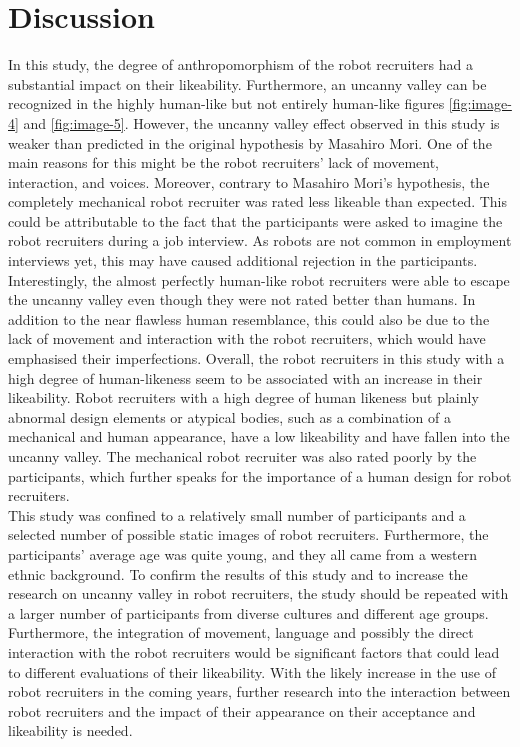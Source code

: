 \section{Discussion}
In this study, the degree of anthropomorphism of the robot recruiters had a substantial impact on their likeability. Furthermore, an uncanny valley can be recognized in the highly human-like but not entirely human-like figures \ref{fig:image-4} and \ref{fig:image-5}. However, the uncanny valley effect observed in this study is weaker than predicted in the original hypothesis by Masahiro Mori. One of the main reasons for this might be the robot recruiters' lack of movement, interaction, and voices. Moreover, contrary to Masahiro Mori's hypothesis, the completely mechanical robot recruiter was rated less likeable than expected. This could be attributable to the fact that the participants were asked to imagine the robot recruiters during a job interview. As robots are not common in employment interviews yet, this may have caused additional rejection in the participants.
Interestingly, the almost perfectly human-like robot recruiters were able to escape the uncanny valley even though they were not rated better than humans. In addition to the near flawless human resemblance, this could also be due to the lack of movement and interaction with the robot recruiters, which would have emphasised their imperfections. 
Overall, the robot recruiters in this study with a high degree of human-likeness seem to be  associated with an increase in their likeability. Robot recruiters with a high degree of human likeness but plainly abnormal design elements or atypical bodies, such as a combination of a mechanical and human appearance, have a low likeability and have fallen into the uncanny valley.
The mechanical robot recruiter was also rated poorly by the participants, which further speaks for the importance of a human design for robot recruiters.\\
This study was confined to a relatively small number of participants and a selected number of possible static images of robot recruiters. Furthermore, the participants' average age was quite young, and they all came from a western ethnic background. To confirm the results of this study and to increase the research on uncanny valley in robot recruiters, the study should be repeated with a larger number of participants from diverse cultures and different age groups.
Furthermore, the integration of movement, language and possibly the direct interaction with the robot recruiters would be significant factors that could lead to different evaluations of their likeability. With the likely increase in the use of robot recruiters in the coming years, further research into the interaction between robot recruiters and the impact of their appearance on their acceptance and likeability is needed. 